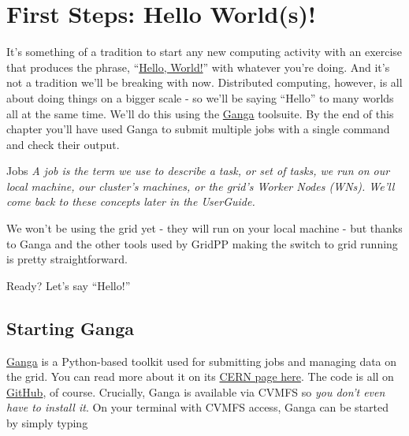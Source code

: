 \section{First Steps: Hello World(s)!}
\label{sec:helloworlds}
It's something of a tradition to start any new computing activity with
an exercise that produces the phrase,
``\href{https://en.wikipedia.org/wiki/\%22Hello,_World!\%22_program}{Hello,
World!}'' with whatever you're doing. And it's not a tradition we'll be
breaking with now. Distributed computing, however, is all about doing
things on a bigger scale - so we'll be saying ``Hello'' to many worlds
all at the same time. We'll do this using the
\href{http://ganga.readthedocs.io}{Ganga} toolsuite. By the end of this
chapter you'll have used Ganga to submit multiple jobs with a single
command and check their output.

\begin{infobox}{Jobs}
\emph{A job is the term we use to describe a task, or set of tasks, we run on
our local machine, our cluster's machines, or the grid's Worker Nodes
(WNs). We'll come back to these concepts later in the UserGuide.}
\end{infobox}

We won't be using the grid yet - they will run on your local machine -
but thanks to Ganga and the other tools used by GridPP making the switch
to grid running is pretty straightforward.

Ready? Let's say ``Hello!''

\subsection{Starting Ganga}\label{starting-ganga}

\href{http://ganga.readthedocs.io}{Ganga} is a Python-based toolkit used
for submitting jobs and managing data on the grid. You can read more
about it on its \href{https://ganga.web.cern.ch/ganga/}{CERN page here}.
The code is all on \href{https://github.com/ganga-devs/ganga}{GitHub},
of course. Crucially, Ganga is available via CVMFS so \emph{you don't
even have to install it}. On your terminal with CVMFS access, Ganga can
be started by simply typing

\begin{Shaded}
\begin{Highlighting}[]
\NormalTok{$ } 
\end{Highlighting}
\end{Shaded}

